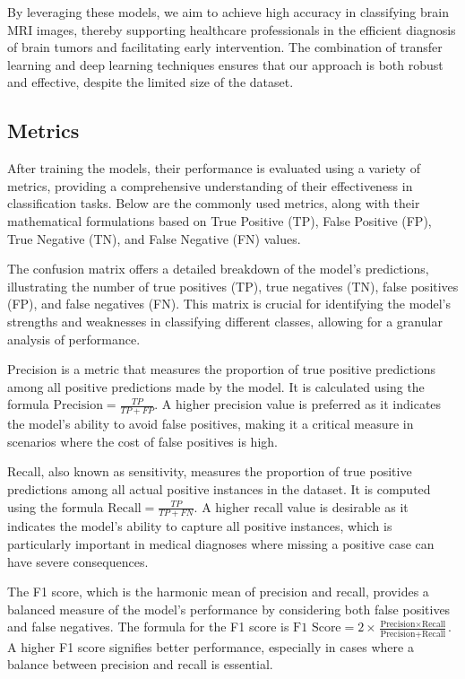 By leveraging these models, we aim to achieve high accuracy in classifying brain MRI images, thereby supporting healthcare professionals in the efficient diagnosis of brain tumors and facilitating early intervention. The combination of transfer learning and deep learning techniques ensures that our approach is both robust and effective, despite the limited size of the dataset.

\subsection{Metrics}\label{metrics}

After training the models, their performance is evaluated using a variety of metrics, providing a comprehensive understanding of their effectiveness in classification tasks. Below are the commonly used metrics, along with their mathematical formulations based on True Positive (TP), False Positive (FP), True Negative (TN), and False Negative (FN) values.

The confusion matrix offers a detailed breakdown of the model's predictions, illustrating the number of true positives (TP), true negatives (TN), false positives (FP), and false negatives (FN). This matrix is crucial for identifying the model's strengths and weaknesses in classifying different classes, allowing for a granular analysis of performance.

Precision is a metric that measures the proportion of true positive predictions among all positive predictions made by the model. It is calculated using the formula \(\text{Precision} = \frac{TP}{TP + FP}\). A higher precision value is preferred as it indicates the model's ability to avoid false positives, making it a critical measure in scenarios where the cost of false positives is high.

Recall, also known as sensitivity, measures the proportion of true positive predictions among all actual positive instances in the dataset. It is computed using the formula \(\text{Recall} = \frac{TP}{TP + FN}\). A higher recall value is desirable as it indicates the model's ability to capture all positive instances, which is particularly important in medical diagnoses where missing a positive case can have severe consequences.

The F1 score, which is the harmonic mean of precision and recall, provides a balanced measure of the model's performance by considering both false positives and false negatives. The formula for the F1 score is \(\text{F1 Score} = 2 \times \frac{\text{Precision} \times \text{Recall}}{\text{Precision} + \text{Recall}}\). A higher F1 score signifies better performance, especially in cases where a balance between precision and recall is essential.

